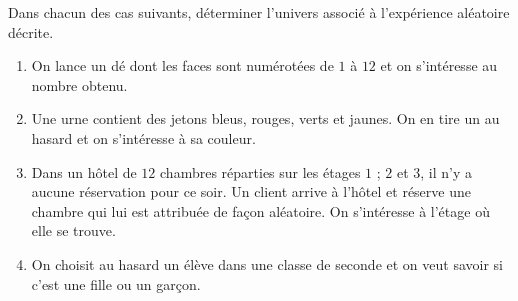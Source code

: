 \begin{exo}
	Dans chacun des cas suivants, déterminer l'univers associé à l'expérience aléatoire décrite.
	\begin{enumerate}
		\item On lance un dé dont les faces sont numérotées de $1$ à $12$ et on s'intéresse au nombre obtenu.
		\item Une urne contient des jetons bleus, rouges, verts et jaunes. On en tire un au hasard et on s'intéresse à sa couleur.
		\item Dans un hôtel de $12$ chambres réparties sur les étages $1$ ; $2$ et $3$, il n'y a aucune réservation pour ce soir. Un client arrive à l'hôtel et réserve une chambre qui lui est attribuée de façon aléatoire. On s'intéresse à l'étage où elle se trouve.
		\item On choisit au hasard un élève dans une classe de seconde et on veut savoir si c'est une fille ou un garçon.
	\end{enumerate}
\end{exo}
